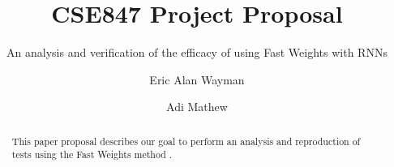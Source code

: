\documentclass[siggraph, review=false]{acmart}
\begin{document}
\title{CSE847 Project Proposal}
\subtitle{An analysis and verification of the efficacy of using Fast Weights with RNNs}

\author{Eric Alan Wayman}

\author{Adi Mathew}

\begin{abstract}
This paper proposal describes our goal to perform an analysis and reproduction of tests using the Fast Weights method \cite{DBLP:conf/nips/BaHMLI16}.
\end{abstract}


\maketitle

% 





\end{document}
